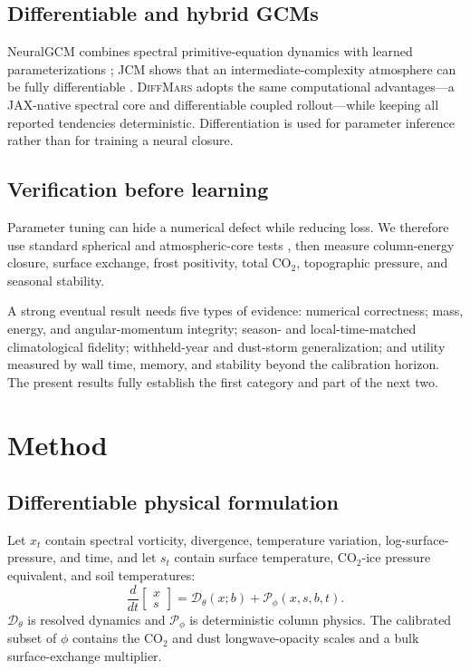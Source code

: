 \documentclass{article}
\newcommand{\model}{\textsc{DiffMars}}
\begin{document}
\subsection{Differentiable and hybrid GCMs}
NeuralGCM combines spectral primitive-equation dynamics with learned
parameterizations \citep{kochkov2024neuralgcm}; JCM shows that an
intermediate-complexity atmosphere can be fully differentiable
\citep{davenport2026jcm}. \model{} adopts the same computational advantages---a
JAX-native spectral core and differentiable coupled rollout---while keeping all
reported tendencies deterministic. Differentiation is used for parameter
inference rather than for training a neural closure.

\subsection{Verification before learning}
Parameter tuning can hide a numerical defect while reducing loss. We therefore use
standard spherical and atmospheric-core tests
\citep{williamson1992standard,held1994proposal,jablonowski2006baroclinic}, then
measure column-energy closure, surface exchange, frost positivity, total
\(\mathrm{CO_2}\), topographic pressure, and seasonal stability.

A strong eventual result needs five types of evidence: numerical correctness;
mass, energy, and angular-momentum integrity; season- and local-time-matched
climatological fidelity; withheld-year and dust-storm generalization; and utility
measured by wall time, memory, and stability beyond the calibration horizon. The
present results fully establish the first category and part of the next two.

\section{Method}

\subsection{Differentiable physical formulation}
Let \(x_t\) contain spectral vorticity, divergence, temperature variation,
log-surface-pressure, and time, and let \(s_t\) contain surface temperature,
\(\mathrm{CO_2}\)-ice pressure equivalent, and soil temperatures:
\begin{equation}
\frac{d}{dt}\begin{bmatrix}x\\s\end{bmatrix}
=\mathcal D_\theta(x;b)+\mathcal P_\phi(x,s,b,t).
\label{eq:hybrid}
\end{equation}
\(\mathcal D_\theta\) is resolved dynamics and \(\mathcal P_\phi\) is
deterministic column physics. The calibrated subset of \(\phi\) contains the
CO$_2$ and dust longwave-opacity scales and a bulk surface-exchange multiplier.
\end{document}
